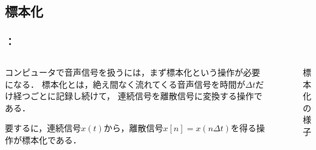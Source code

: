 \documentclass[unicode,11pt]{beamer}
\newcommand{\figurewidth}{5cm}
\newcommand{\termdef}[1]{\alert{\sffamily #1}}
\begin{document}
\subsection{標本化}
\begin{frame}
  \frametitle{\secname ：\subsecname}
  \begin{columns}
    \begin{column}{0.6\textwidth}
      コンピュータで音声信号を扱うには，まず\termdef{標本化}という操作が必要になる．
      標本化とは，絶え間なく流れてくる音声信号を時間が\(\Delta t\)だけ経つごとに記録し続けて，
      連続信号を離散信号に変換する操作である．
    
      要するに，連続信号\(x(t)\)から，離散信号\(x[n]=x(n\Delta t)\)を得る操作が標本化である．      
    \end{column}
    \begin{column}{0.4\textwidth}
      \begin{figure}
        \centering
        \caption{標本化の様子}
      \end{figure}
    \end{column}
  \end{columns}
\end{frame}
\end{document}
